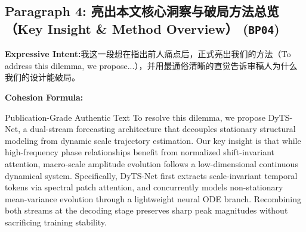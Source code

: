 \subsection*{Paragraph 4: 亮出本文核心洞察与破局方法总览（Key Insight \& Method Overview） (\texttt{BP04})}
\noindent\textbf{Expressive Intent:}\enspace 我这一段想在指出前人痛点后，正式亮出我们的方法（To address this dilemma, we propose...），并用最通俗清晰的直觉告诉审稿人为什么我们的设计能破局。\par
\noindent\textbf{Cohesion Formula:}\par\vspace{4pt}
\begin{ExampleBox}{Publication-Grade Authentic Text}
To resolve this dilemma, we propose DyTS-Net, a dual-stream forecasting architecture that decouples stationary structural modeling from dynamic scale trajectory estimation. Our key insight is that while high-frequency phase relationships benefit from normalized shift-invariant attention, macro-scale amplitude evolution follows a low-dimensional continuous dynamical system. Specifically, DyTS-Net first extracts scale-invariant temporal tokens via spectral patch attention, and concurrently models non-stationary mean-variance evolution through a lightweight neural ODE branch. Recombining both streams at the decoding stage preserves sharp peak magnitudes without sacrificing training stability.
\end{ExampleBox}
